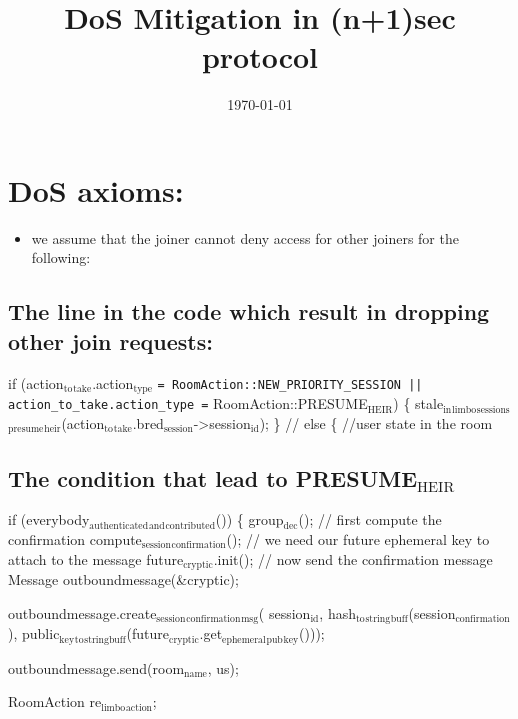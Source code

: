 \documentclass[11pt]{article}
\date{\today}
\title{DoS Mitigation in (n+1)sec protocol}
\begin{document}
\maketitle
\tableofcontents

\section{DoS axioms:}
\label{sec-1}
\begin{itemize}
\item we assume that the joiner cannot deny access for other joiners for the following:
\end{itemize}
\subsection{The line in the code which result in dropping other join requests:}
\label{sec-1-1}
   if (action$_{\text{to}}$$_{\text{take}}$.action$_{\text{type}}$ \texttt{= RoomAction::NEW\_PRIORITY\_SESSION ||
            action\_to\_take.action\_type =} RoomAction::PRESUME$_{\text{HEIR}}$) \{
    stale$_{\text{in}}$$_{\text{limbo}}$$_{\text{sessions}}$$_{\text{presume}}$$_{\text{heir}}$(action$_{\text{to}}$$_{\text{take}}$.bred$_{\text{session}}$->session$_{\text{id}}$);
\} // else \{ //user state in the room

\subsection{The condition that lead to PRESUME$_{\text{HEIR}}$}
\label{sec-1-2}
if (everybody$_{\text{authenticated}}$$_{\text{and}}$$_{\text{contributed}}$()) \{
    group$_{\text{dec}}$();
    // first compute the confirmation
    compute$_{\text{session}}$$_{\text{confirmation}}$();
    // we need our future ephemeral key to attach to the message
    future$_{\text{cryptic}}$.init();
    // now send the confirmation message
    Message outboundmessage(\&cryptic);

outboundmessage.create$_{\text{session}}$$_{\text{confirmation}}$$_{\text{msg}}$(
    session$_{\text{id}}$, hash$_{\text{to}}$$_{\text{string}}$$_{\text{buff}}$(session$_{\text{confirmation}}$),
    public$_{\text{key}}$$_{\text{to}}$$_{\text{stringbuff}}$(future$_{\text{cryptic}}$.get$_{\text{ephemeral}}$$_{\text{pub}}$$_{\text{key}}$()));

outboundmessage.send(room$_{\text{name}}$, us);

RoomAction re$_{\text{limbo}}$$_{\text{action}}$;
\end{document}
